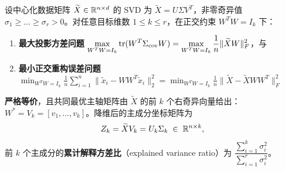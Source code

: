 \begin{thmBox}
\begin{theorem}
\label{thm:ch4-pca}
设中心化数据矩阵 $\widetilde{X} \in \mathbb{R}^{n\times d}$ 的 SVD 为 $\widetilde{X} = U \Sigma V^T$，非零奇异值 $\sigma_1 \ge \dots \ge \sigma_r > 0$。对任意目标维数 $1 \le k \le r$，在正交约束 $W^T W = I_k$ 下：
\begin{enumerate}
  \item \textbf{最大投影方差问题} $\displaystyle\max_{W^T W = I_k} \operatorname{tr}(W^T \Sigma_{\mathrm{cov}} W) = \max_{W^T W = I_k} \frac{1}{n}\|\widetilde{X} W\|_F^2$，与
  \item \textbf{最小正交重构误差问题} $\displaystyle\min_{W^T W = I_k} \frac{1}{n}\sum_{i=1}^n \|\tilde{x}_i - W W^T \tilde{x}_i\|_2^2 = \min_{W^T W = I_k} \frac{1}{n}\|\widetilde{X} - \widetilde{X} W W^T\|_F^2$
\end{enumerate}
\textbf{严格等价}，且共同最优主轴矩阵由 $\widetilde{X}$ 的前 $k$ 个右奇异向量给出：$W^* = V_k = [v_1,\dots,v_k]$。降维后的主成分坐标矩阵为
\begin{equation}
  Z_k = \widetilde{X} V_k = U_k \Sigma_k \;\in\; \mathbb{R}^{n\times k}, \label{eq:ch4-pca-scores}
\end{equation}
前 $k$ 个主成分的\textbf{累计解释方差比}（explained variance ratio）为 $\dfrac{\sum_{i=1}^k \sigma_i^2}{\sum_{i=1}^r \sigma_i^2}$。
\end{theorem}
\end{thmBox}

